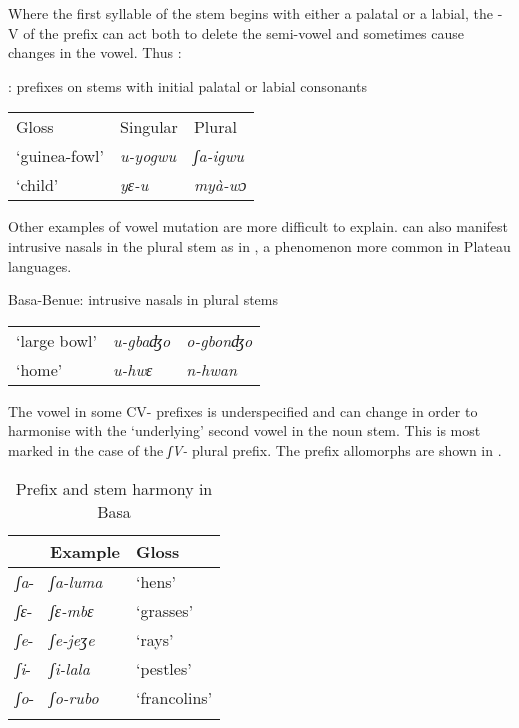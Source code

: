 \documentclass[output=paper]{langsci/langscibook}
\begin{document}
Where the first syllable of the stem begins with either a palatal or a labial, the -V of the prefix can act both to delete the semi-vowel and sometimes cause changes in the vowel. Thus :

\newpage  
\ea\label{ex:kainji:6}
: prefixes on stems with initial palatal or labial consonants \\
 \begin{tabularx}{.8\textwidth}{XXX}
     Gloss    & Singular  & Plural \\
`guinea-fowl’ &    \textit{u-yogwu} &   \textit{ʃa-igwu}\\
`child’ & \textit{yɛ-u}   & \textit{myà-wɔ}\\
\end{tabularx}
\z

Other examples of vowel mutation are more difficult to explain.  can also manifest intrusive nasals in the plural stem as in , a phenomenon more common in Plateau languages. 

\ea\label{ex:kainji:7}
Basa-Benue: intrusive nasals in plural stems \\
 \begin{tabularx}{.8\textwidth}{lXX}
`large bowl’  & \textit{u-gbaʤo}&   \textit{o-gbonʤo}\\
`home’&   \textit{u-hwɛ} &  \textit{n-hwan}\\
\end{tabularx}
\z

The vowel in some CV- prefixes is underspecified and can change in order to harmonise with the ‘underlying’ second vowel in the noun stem. This is most marked in the case of the \textit{ʃV-} plural prefix. The prefix allomorphs are shown in .

\begin{table}
\caption{\label{tab:kainji:25} Prefix and stem harmony in Basa}
\begin{tabularx}{\textwidth}{XXX}
\lsptoprule
	& {Example}	& {Gloss}\\
	\midrule
\textit{ʃa}-	& \textit{ʃa-luma}	& `hens'\\
\textit{ʃɛ}-	& \textit{ʃɛ-mbɛ}	& `grasses'\\
\textit{ʃe}-	& \textit{ʃe-jeʒe}	& `rays'\\
\textit{ʃi}-	& \textit{ʃi-lala}	& `pestles'\\
\textit{ʃo}-	& \textit{ʃo-rubo}	& `francolins'\\
\lspbottomrule
\end{tabularx}
\end{table}
\end{document}
